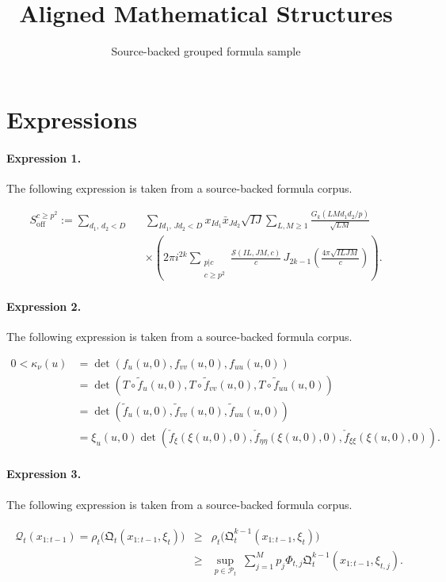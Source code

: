 \documentclass[11pt]{article}
\title{Aligned Mathematical Structures}
\author{Source-backed grouped formula sample}
\date{}
\begin{document}
\maketitle
\section{Expressions}
\paragraph{Expression 1.} The following expression is taken from a source-backed formula corpus.

\begin{align*} S_{\mathrm{off}}^{c\geq p^2}:=\sum_{d_1,\,d_2<D} \,\, \,\ &\sum_{Id_1, \,Jd_2<D}x_{Id_1}\bar{x}_{Jd_2}\sqrt{IJ}\sum_{L, M\geq 1}\frac{G_k(LMd_1d_2\slash p)}{\sqrt{LM}} \\ &\times\left(2 \pi i^{2k} \sum_{\substack{p|c\\ c \geq p^2}}\frac{\mathcal{S}(IL, JM, c )}{c} \,J_{2k-1}\left(\frac{4\pi \sqrt{ILJM}}{c}\right)\right).\end{align*}

\paragraph{Expression 2.} The following expression is taken from a source-backed formula corpus.

\begin{align*} 0<\kappa_\nu(u) &=\det(f_u(u,0),f_{vv}(u,0),f_{uu}(u,0)) \\ &=\det(T \circ \tilde f_u(u,0),T \circ \tilde f_{vv}(u,0), T \circ \tilde f_{uu}(u,0))\\ &=\det(\tilde f_u(u,0),\tilde f_{vv}(u,0),\tilde f_{uu}(u,0))\\ &=\xi_u(u,0) \det(\check f_\xi(\xi(u,0),0), \check f_{\eta\eta}(\xi(u,0),0), \check f_{\xi\xi}(\xi(u,0),0)).\end{align*}

\paragraph{Expression 3.} The following expression is taken from a source-backed formula corpus.

\begin{align*}\begin{array}{lll}\mathcal{Q}_{t}(x_{1:t-1})=\rho_t\Big( \mathfrak{Q}_{t}(x_{1:t-1}, \xi_t) \Big) & \geq & \rho_t \Big( \mathfrak{Q}_{t}^{k-1}(x_{1:t-1}, \xi_t) \Big)\\& \geq & \displaystyle \sup_{p \in \mathcal{P}_t} \;\displaystyle \sum_{j=1}^{M} p_j \Phi_{t, j} \mathfrak{Q}_{t}^{k-1}(x_{1:t-1}, \xi_{t, j}).\end{array}\end{align*}
\end{document}
